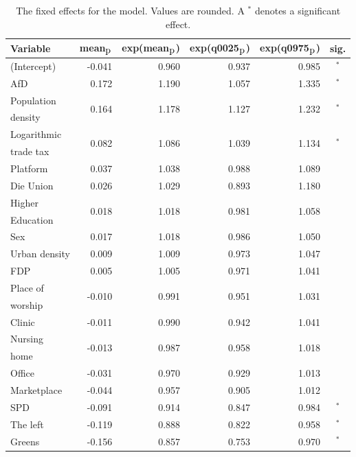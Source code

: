 \begin{table}[H]
\caption{The fixed effects for the model. Values are rounded. A $^*$ denotes a significant effect. \label{FixedAllGermany_nospatial}}
\begin{tabular}{l r r r r c}
\toprule
\textbf{Variable}	& \textbf{mean$_{\hbox{p}}$}	& \textbf{exp(mean$_{\hbox{p}}$)} & \textbf{exp(q0025$_{\hbox{p}}$)} & \textbf{exp(q0975$_{\hbox{p}}$)} & \textbf{sig.}\\
\midrule
(Intercept) & -0.041 & 0.960 & 0.937 & 0.985 & $^*$\\
AfD & 0.172 & 1.190 & 1.057 & 1.335 & $^*$\\
Population & \multirow{2}{*}{0.164} & \multirow{2}{*}{1.178} & \multirow{2}{*}{1.127} & \multirow{2}{*}{1.232} & \multirow{2}{*}{$^*$}\\
density \\
Logarithmic & \multirow{2}{*}{0.082} & \multirow{2}{*}{1.086} & \multirow{2}{*}{1.039} & \multirow{2}{*}{1.134} & \multirow{2}{*}{$^*$}\\
trade tax \\
Platform & 0.037 & 1.038 & 0.988 & 1.089 \\
Die Union & 0.026 & 1.029 & 0.893 & 1.180\\
Higher & \multirow{2}{*}{0.018} & \multirow{2}{*}{1.018} & \multirow{2}{*}{0.981} & \multirow{2}{*}{1.058} \\
Education\\
Sex & 0.017 & 1.018 & 0.986 & 1.050 & \\
Urban density & 0.009 & 1.009 & 0.973 & 1.047 \\
FDP & 0.005 & 1.005 & 0.971 & 1.041 \\
Place of & \multirow{2}{*}{-0.010} & \multirow{2}{*}{0.991} & \multirow{2}{*}{0.951} & \multirow{2}{*}{1.031} \\
worship\\
Clinic & -0.011 & 0.990 & 0.942 & 1.041 \\
Nursing & \multirow{2}{*}{-0.013} & \multirow{2}{*}{0.987} & \multirow{2}{*}{0.958} & \multirow{2}{*}{1.018} \\
home\\
Office & -0.031 & 0.970 & 0.929 & 1.013 \\
Marketplace & -0.044 & 0.957 & 0.905 & 1.012 \\
SPD & -0.091 & 0.914 & 0.847 & 0.984 & $^*$\\
The left & -0.119 & 0.888 & 0.822 & 0.958 & $^*$\\
Greens & -0.156 & 0.857 & 0.753 & 0.970 & $^*$\\
\bottomrule
\end{tabular}
\end{table}
\clearpage
